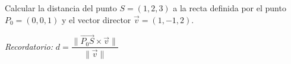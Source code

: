 Calcular la distancia del punto $S = (1, 2, 3)$ a la recta definida por el punto $P_0 = (0, 0, 1)$ y el vector director $\vec{v} = (1, -1, 2)$.

\textit{Recordatorio:} $d = \dfrac{\|\overrightarrow{P_0S} \times \vec{v}\|}{\|\vec{v}\|}$